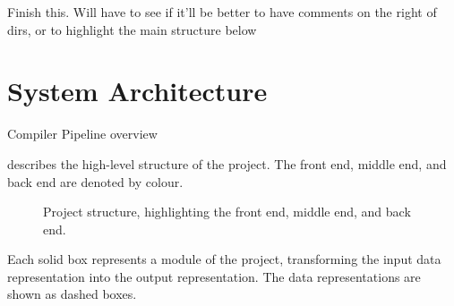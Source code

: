 \documentclass[00-main.tex]{subfiles}
\begin{document}


\begin{Comment}
Finish this. Will have to see if it'll be better to have comments on the right of dirs, or to highlight the main structure below
\end{Comment}

\section{System Architecture}

\begin{Comment}
Compiler Pipeline overview
\end{Comment}

 describes the high-level structure of the project. The \textcolor{frontendcolor}{front end}, \textcolor{middleendcolor}{middle end}, and \textcolor{backendcolor}{back end} are denoted by colour.

\begin{figure}[H]
  \centering
  \caption{Project structure, highlighting the \textcolor{frontendcolor}{front end}, \textcolor{middleendcolor}{middle end}, and \textcolor{backendcolor}{back end}.}
  \label{fig:project flowchart}
\end{figure}

Each solid box represents a module of the project, transforming the input data representation into the output representation.
The data representations are shown as dashed boxes.
\end{document}
